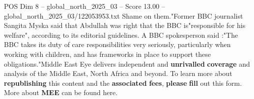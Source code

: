 \begin{textsample}{POS Dim 8 – global\_north\_2025\_03 – Score 13.00 – global\_north\_2025\_03/122053953.txt}
Shame on them."Former BBC journalist Sangita Myska said that Abdullah was right that the BBC is"responsible for his welfare", according to its editorial guidelines.
A BBC spokesperson said :"The BBC takes its duty of care responsibilities very seriously, particularly when working with children, and has frameworks in place to support these obligations."Middle East Eye delivers independent and \textbf{unrivalled} \textbf{coverage} and analysis of the Middle East, North Africa and beyond.
To learn more about \textbf{republishing} this content and the \textbf{associated} \textbf{fees}, \textbf{please} \textbf{fill} out this form.
More about \textbf{MEE} can be found here.

\end{textsample}
